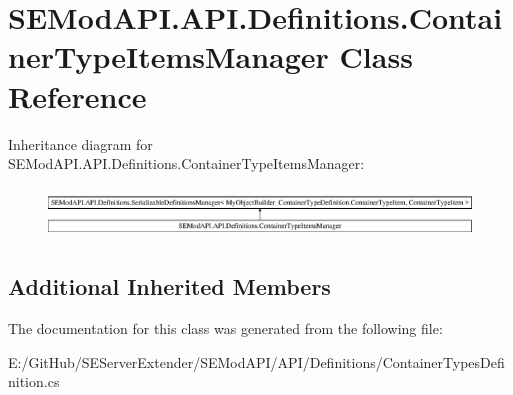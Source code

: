 \hypertarget{class_s_e_mod_a_p_i_1_1_a_p_i_1_1_definitions_1_1_container_type_items_manager}{}\section{S\+E\+Mod\+A\+P\+I.\+A\+P\+I.\+Definitions.\+Container\+Type\+Items\+Manager Class Reference}
\label{class_s_e_mod_a_p_i_1_1_a_p_i_1_1_definitions_1_1_container_type_items_manager}
Inheritance diagram for S\+E\+Mod\+A\+P\+I.\+A\+P\+I.\+Definitions.\+Container\+Type\+Items\+Manager\+:\begin{figure}[H]
\begin{center}
\leavevmode
\includegraphics[height=1.344538cm]{class_s_e_mod_a_p_i_1_1_a_p_i_1_1_definitions_1_1_container_type_items_manager}
\end{center}
\end{figure}
\subsection*{Additional Inherited Members}


The documentation for this class was generated from the following file\+:\begin{DoxyCompactItemize}
\item 
E\+:/\+Git\+Hub/\+S\+E\+Server\+Extender/\+S\+E\+Mod\+A\+P\+I/\+A\+P\+I/\+Definitions/Container\+Types\+Definition.\+cs\end{DoxyCompactItemize}
